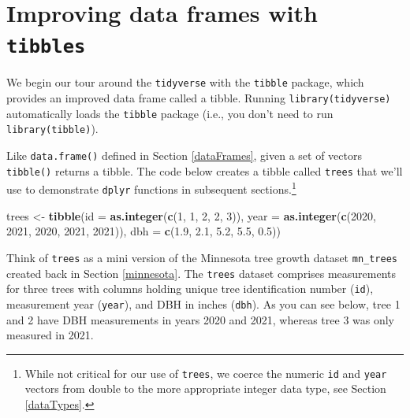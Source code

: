 \documentclass[
  11pt,
]{krantz}
\newenvironment{Shaded}{\begin{snugshade}}{\end{snugshade}}
\newcommand{\DataTypeTok}[1]{\textcolor[rgb]{0.13,0.29,0.53}{#1}}
\newcommand{\DecValTok}[1]{\textcolor[rgb]{0.00,0.00,0.81}{#1}}
\newcommand{\FloatTok}[1]{\textcolor[rgb]{0.00,0.00,0.81}{#1}}
\newcommand{\KeywordTok}[1]{\textcolor[rgb]{0.13,0.29,0.53}{\textbf{#1}}}
\newcommand{\NormalTok}[1]{#1}
\newcommand{\StringTok}[1]{\textcolor[rgb]{0.31,0.60,0.02}{#1}}
\theoremstyle{definition}
\theoremstyle{definition}
\theoremstyle{definition}
\theoremstyle{definition}
\theoremstyle{remark}
\begin{document}
\hypertarget{tibbles}{%
\section{\texorpdfstring{Improving data frames with \texttt{tibbles}}{Improving data frames with tibbles}}\label{tibbles}}

We begin our tour around the \texttt{tidyverse} with the \texttt{tibble} package, which provides an improved data frame called a tibble. Running \texttt{library(tidyverse)} automatically loads the \texttt{tibble} package (i.e., you don't need to run \texttt{library(tibble)}).

Like \texttt{data.frame()} defined in Section \ref{dataFrames}, given a set of vectors \texttt{tibble()} returns a tibble. The code below creates a tibble called \texttt{trees} that we'll use to demonstrate \texttt{dplyr} functions in subsequent sections.\footnote{While not critical for our use of \texttt{trees}, we coerce the numeric \texttt{id} and \texttt{year} vectors from double to the more appropriate integer data type, see Section \ref{dataTypes}.}

\begin{Shaded}
\begin{Highlighting}[]
\NormalTok{trees \textless{}{-}}\StringTok{ }\KeywordTok{tibble}\NormalTok{(}\DataTypeTok{id =} \KeywordTok{as.integer}\NormalTok{(}\KeywordTok{c}\NormalTok{(}\DecValTok{1}\NormalTok{, }\DecValTok{1}\NormalTok{, }\DecValTok{2}\NormalTok{, }\DecValTok{2}\NormalTok{, }\DecValTok{3}\NormalTok{)), }
                \DataTypeTok{year =} \KeywordTok{as.integer}\NormalTok{(}\KeywordTok{c}\NormalTok{(}\DecValTok{2020}\NormalTok{, }\DecValTok{2021}\NormalTok{, }\DecValTok{2020}\NormalTok{, }\DecValTok{2021}\NormalTok{, }\DecValTok{2021}\NormalTok{)),}
                \DataTypeTok{dbh =} \KeywordTok{c}\NormalTok{(}\FloatTok{1.9}\NormalTok{, }\FloatTok{2.1}\NormalTok{, }\FloatTok{5.2}\NormalTok{, }\FloatTok{5.5}\NormalTok{, }\FloatTok{0.5}\NormalTok{))}
\end{Highlighting}
\end{Shaded}

Think of \texttt{trees} as a mini version of the Minnesota tree growth dataset \texttt{mn\_trees} created back in Section \ref{minnesota}. The \texttt{trees} dataset comprises measurements for three trees with columns holding unique tree identification number (\texttt{id}), measurement year (\texttt{year}), and DBH in inches (\texttt{dbh}). As you can see below, tree 1 and 2 have DBH measurements in years 2020 and 2021, whereas tree 3 was only measured in 2021.
\end{document}
